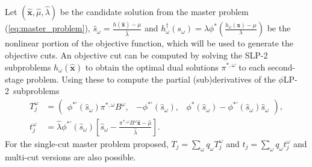 \documentclass[12pt]{article}
\newcommand{\x}{\mathbf{x}}
\newcommand{\xh}{\hat{\x}}
\newcommand{\lh}{\hat{\lambda}}
\newcommand{\mh}{\hat{\mu}}
\theoremstyle{plain}
\theoremstyle{definition}
\theoremstyle{remark}
\newcommand{\plp}{$\phi$LP-2}
\begin{document}
Let $(\xh,\mh, \lh)$ be the candidate solution from the master problem (\ref{eq:master_problem}), $\hat{s}_\omega = \frac{h(\xh)-\mu}{\lh}$ and $h^\dagger_\omega(s_\omega) = \lambda \phi^*\left(\frac{h_\omega(\x) - \mu}{\lambda}\right)$ be the nonlinear portion of the objective function, which will be used to generate the objective cuts.
An objective cut can be computed by solving the SLP-2 subproblems $h_\omega(\xh)$ to obtain the optimal dual solutions $\pi^{*,\omega}$ to each second-stage problem. Using these to compute the partial (sub)derivatives of the \plp\ subproblems
\begin{align*}
	T_j^\omega & = 
	\left( \begin{array}{ccc}
		\phi^{*\prime}(\hat{s}_\omega) \pi^{*,\omega}B^\omega, 
			 & -\phi^{*\prime}(\hat{s}_\omega), 
			 & \phi^*(\hat{s}_\omega) - \phi^{*\prime}(\hat{s}_\omega) \hat{s}_\omega
	\end{array} \right), \\
	t_j^\omega & = \lh \phi^{*\prime}(\hat{s}_\omega)\left[\hat{s}_\omega - \frac{\pi^{*,\omega}B^\omega\xh - \mh}{\lh}\right].
\end{align*}
For the single-cut master problem proposed, $T_j = \sum_\omega q_\omega T_j^\omega$ and $t_j = \sum_\omega q_\omega t_j^\omega$ and multi-cut versions are also possible. 
\end{document}
